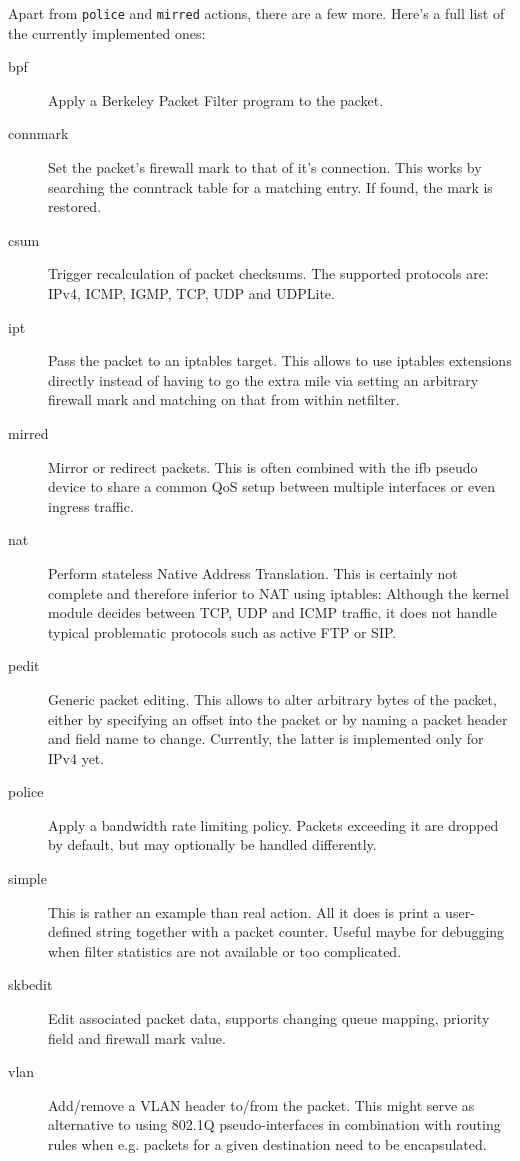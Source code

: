 \documentclass[12pt,twoside]{article}
\begin{document}
Apart from \texttt{police} and \texttt{mirred} actions, there are a few more. Here's a full
list of the currently implemented ones:
\begin{description}
\item[bpf]
        Apply a Berkeley Packet Filter program to the packet.

\item[connmark]
        Set the packet's firewall mark to that of it's connection. This works by
        searching the conntrack table for a matching entry. If found, the mark
        is restored.

\item[csum]
        Trigger recalculation of packet checksums. The supported protocols are:
        IPv4, ICMP, IGMP, TCP, UDP and UDPLite.

\item[ipt]
        Pass the packet to an iptables target. This allows to use iptables
        extensions directly instead of having to go the extra mile via setting
        an arbitrary firewall mark and matching on that from within netfilter.

\item[mirred]
        Mirror or redirect packets. This is often combined with the ifb pseudo
        device to share a common QoS setup between multiple interfaces or even
        ingress traffic.

\item[nat]
        Perform stateless Native Address Translation. This is certainly not
        complete and therefore inferior to NAT using iptables: Although the
        kernel module decides between TCP, UDP and ICMP traffic, it does not
        handle typical problematic protocols such as active FTP or SIP.

\item[pedit]
        Generic packet editing. This allows to alter arbitrary bytes of the
        packet, either by specifying an offset into the packet or by naming a
        packet header and field name to change. Currently, the latter is
        implemented only for IPv4 yet.

\item[police]
        Apply a bandwidth rate limiting policy. Packets exceeding it are dropped
        by default, but may optionally be handled differently.

\item[simple]
        This is rather an example than real action. All it does is print a
        user-defined string together with a packet counter. Useful maybe for
        debugging when filter statistics are not available or too complicated.

\item[skbedit]
        Edit associated packet data, supports changing queue mapping, priority
        field and firewall mark value.

\item[vlan]
        Add/remove a VLAN header to/from the packet. This might serve as
        alternative to using 802.1Q pseudo-interfaces in combination with
        routing rules when e.g. packets for a given destination need to be
        encapsulated.
\end{description}
\end{document}
